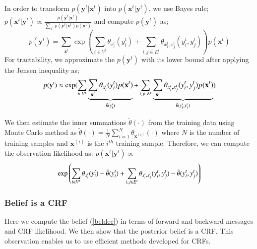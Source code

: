 In order to transform  $p(\mathbf{y}^t|\mathbf{x}^t)$ into  $p(\mathbf{x}^t|\mathbf{y}^t)$, we use Bayes rule;
$p(\mathbf{x}^t|\mathbf{y}^t) \propto  \frac{p(\mathbf{y}^t|\mathbf{x}^t)}{ \sum_{x^t} p(\mathbf{y}^t|\mathbf{x}^t)p(\mathbf{x}^t)}$ and compute $p(\mathbf{y}^t)$ as; %
\begin{equation}
p(\mathbf{y}^t)=\sum_{\mathbf{x}^t} \exp\left( \sum_{i \in V^t} \theta_{x^t_i}(y^t_i) + \sum_{i,j \in E^t} \theta_{x^t_i,x^t_j}(y^t_i,y^t_j) \right) p(\mathbf{x}^t)
\end{equation}
For tractability, we approximate the $p(\mathbf{y}^t)$ with its lower bound after applying the Jensen inequality as;
\begin{equation}
	\small
p(\mathbf{y}^t) \approx \exp ( \sum_{i \in V^t} \underbrace{\sum_{\mathbf{x}^t} \theta_{x^t_i}(y^t_i)  p(\mathbf{x}^t)}_{\tilde{\theta}(y^t_i)} + \sum_{i,j \in E^t} \underbrace{ \sum_{\mathbf{x}^t}  \theta_{x^t_i,x^t_j}(y^t_i,y^t_j) p(\mathbf{x}^t)}_{\tilde{\theta}(y^t_i,y^t_j)} )
\end{equation}

We then estimate the inner summations $\tilde{\theta}(\cdot)$
from the training data
using Monte Carlo method
 as \mbox{$\tilde{\theta}(\cdot) = \frac{1}{N}\sum_{i=1}^N \theta_{\mathbf{x}^{(i)}}(\cdot)$} where $N$ is the number of training samples and $\mathbf{x}^{(i)}$ is the $i^{th}$ training sample.
 Therefore, we can compute the observation likelihood as:  $p(\mathbf{x}^t|\mathbf{y}^t) \propto$
\begin{equation}\small
\exp\left( \sum_{i \in V^t} \theta_{x^t_i}(y^t_i) - \tilde{\theta}(y^t_i) + \sum_{i,j \in E^t} \theta_{x^t_i,x^t_j}(y^t_i,y^t_j) - \tilde{\theta}(y^t_i,y^t_j)  \right)
\label{obsprob}
\end{equation}

\subsubsection{Belief is a CRF}
\label{beliscrf}
Here we compute the belief (\ref{beldec}) in terms of forward and backward messages and CRF likelihood. We then show that the posterior belief is a CRF. This observation enables us to use efficient methods developed for CRFs.

